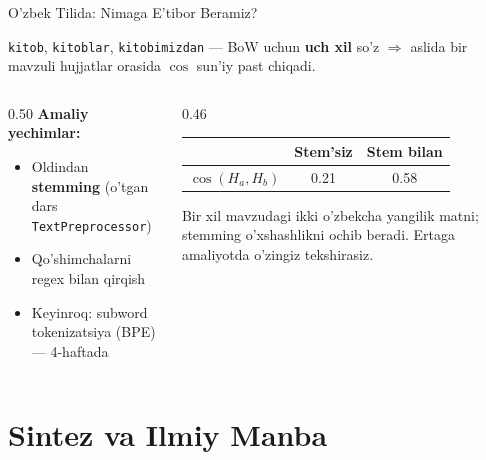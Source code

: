 \documentclass[aspectratio=169,11pt]{beamer}
\begin{document}
\begin{frame}{O'zbek Tilida: Nimaga E'tibor Beramiz?}
  \begin{tcolorbox}[defbox,title=Agglutinativlik kosinusga qanday ta'sir qiladi?]
    \small \texttt{kitob}, \texttt{kitoblar}, \texttt{kitobimizdan} ---
    BoW uchun \textbf{uch xil} so'z $\Rightarrow$ aslida bir mavzuli
    hujjatlar orasida $\cos$ sun'iy past chiqadi.
  \end{tcolorbox}
  \vspace{0.3em}
  \begin{columns}
    \begin{column}{0.50\textwidth}
      \textbf{Amaliy yechimlar:}
      \begin{itemize}\setlength\itemsep{3pt}
        \item Oldindan \textbf{stemming} (o'tgan dars
              \texttt{TextPreprocessor})
        \item Qo'shimchalarni regex bilan qirqish
        \item Keyinroq: subword tokenizatsiya (BPE) --- 4-haftada
      \end{itemize}
    \end{column}
    \begin{column}{0.46\textwidth}
      \begin{center}\small
      \begin{tabular}{lcc}
        \toprule
        & \textbf{Stem'siz} & \textbf{Stem bilan} \\
        \midrule
        $\cos(H_a,H_b)$ & 0.21 & 0.58 \\
        \bottomrule
      \end{tabular}
      \end{center}
      {\scriptsize\color{halfgray}Bir xil mavzudagi ikki o'zbekcha
      yangilik matni; stemming o'xshashlikni ochib beradi.
      Ertaga amaliyotda o'zingiz tekshirasiz.}
    \end{column}
  \end{columns}
\end{frame}

\section[Sintez]{Sintez va Ilmiy Manba}
\end{document}
